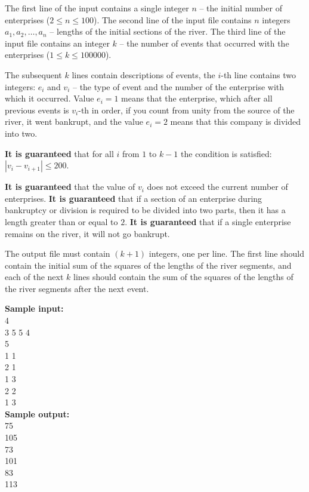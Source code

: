 \documentclass[a4paper]{article}
\begin{document}
The first line of the input contains a single integer $n$ -- the initial number of enterprises ($2 \le n \le 100$). The second line of the input file contains $n$ integers $a_1, a_2, \dots, a_n$ -- lengths of the initial sections of the river.
The third line of the input file contains an integer $k$ -- the number of events that occurred with the enterprises ($1 \le k \le 100000$).

The subsequent $k$ lines contain descriptions of events, the $i$-th line contains two integers: $e_i$ and $v_i$ -- the type of event and the number of the enterprise with which it occurred. Value $e_i = 1$ means that the enterprise, which after all previous events is $v_i$-th in order, if you count from unity from the source of the river, it went bankrupt, and the value $e_i = 2$ means that this company is divided into two.

\textbf{It is guaranteed} that for all $i$ from $1$ to $k-1$ the condition is satisfied: $|v_i - v_{i + 1}| \le 200$.

\textbf{It is guaranteed} that the value of $v_i$ does not exceed the current number of enterprises. \textbf{It is guaranteed} that if a section of an enterprise during bankruptcy or division is required to be divided into two parts, then it has a length greater than or equal to $2$. \textbf{It is guaranteed} that if a single enterprise remains on the river, it will not go bankrupt.

The output file must contain $(k + 1)$ integers, one per line. The first line should contain the initial sum of the squares of the lengths of the river segments, and each of the next $k$ lines should contain the sum of the squares of the lengths of the river segments after the next event.

\LINE

\noindent \textbf{Sample input:}\\
4\\
3 5 5 4\\
5\\
1 1\\
2 1\\
1 3\\
2 2\\
1 3\\


\noindent \textbf{Sample output:}\\
75\\
105\\
73\\
101\\
83\\
113\\
\end{document}
